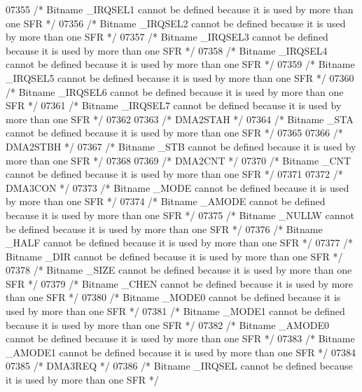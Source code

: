 \begin{DoxyCode}
07355 \textcolor{comment}{/* Bitname \_IRQSEL1 cannot be defined because it is used by more than one SFR */}
07356 \textcolor{comment}{/* Bitname \_IRQSEL2 cannot be defined because it is used by more than one SFR */}
07357 \textcolor{comment}{/* Bitname \_IRQSEL3 cannot be defined because it is used by more than one SFR */}
07358 \textcolor{comment}{/* Bitname \_IRQSEL4 cannot be defined because it is used by more than one SFR */}
07359 \textcolor{comment}{/* Bitname \_IRQSEL5 cannot be defined because it is used by more than one SFR */}
07360 \textcolor{comment}{/* Bitname \_IRQSEL6 cannot be defined because it is used by more than one SFR */}
07361 \textcolor{comment}{/* Bitname \_IRQSEL7 cannot be defined because it is used by more than one SFR */}
07362 
07363 \textcolor{comment}{/* DMA2STAH */}
07364 \textcolor{comment}{/* Bitname \_STA cannot be defined because it is used by more than one SFR */}
07365 
07366 \textcolor{comment}{/* DMA2STBH */}
07367 \textcolor{comment}{/* Bitname \_STB cannot be defined because it is used by more than one SFR */}
07368 
07369 \textcolor{comment}{/* DMA2CNT */}
07370 \textcolor{comment}{/* Bitname \_CNT cannot be defined because it is used by more than one SFR */}
07371 
07372 \textcolor{comment}{/* DMA3CON */}
07373 \textcolor{comment}{/* Bitname \_MODE cannot be defined because it is used by more than one SFR */}
07374 \textcolor{comment}{/* Bitname \_AMODE cannot be defined because it is used by more than one SFR */}
07375 \textcolor{comment}{/* Bitname \_NULLW cannot be defined because it is used by more than one SFR */}
07376 \textcolor{comment}{/* Bitname \_HALF cannot be defined because it is used by more than one SFR */}
07377 \textcolor{comment}{/* Bitname \_DIR cannot be defined because it is used by more than one SFR */}
07378 \textcolor{comment}{/* Bitname \_SIZE cannot be defined because it is used by more than one SFR */}
07379 \textcolor{comment}{/* Bitname \_CHEN cannot be defined because it is used by more than one SFR */}
07380 \textcolor{comment}{/* Bitname \_MODE0 cannot be defined because it is used by more than one SFR */}
07381 \textcolor{comment}{/* Bitname \_MODE1 cannot be defined because it is used by more than one SFR */}
07382 \textcolor{comment}{/* Bitname \_AMODE0 cannot be defined because it is used by more than one SFR */}
07383 \textcolor{comment}{/* Bitname \_AMODE1 cannot be defined because it is used by more than one SFR */}
07384 
07385 \textcolor{comment}{/* DMA3REQ */}
07386 \textcolor{comment}{/* Bitname \_IRQSEL cannot be defined because it is used by more than one SFR */}

\end{DoxyCode}

